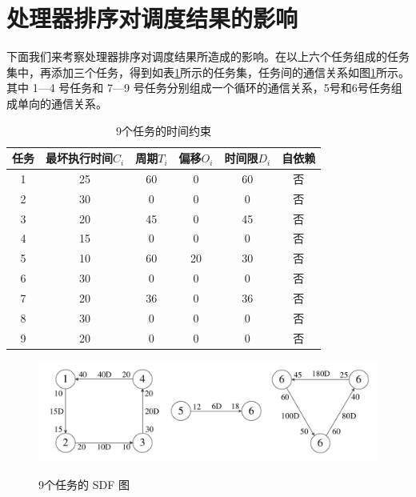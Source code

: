 \section{处理器排序对调度结果的影响}
下面我们来考察处理器排序对调度结果所造成的影响。在以上六个任务组成的任务集中，再添加三个任务，得到如表\ref{EXP-table-9task-time}所示的任务集，任务间的通信关系如图\ref{EXP-fig-9task-SDF}所示。其中 1---4 号任务和 7---9 号任务分别组成一个循环的通信关系，5号和6号任务组成单向的通信关系。
{\renewcommand{\arraystretch}{1.5}
\begin{table}
  \centering
  \caption{9个任务的时间约束}
  \label{EXP-table-9task-time}
  \begin{tabular}{|c|c|c|c|c|c|}
    \hline
    任务 & 最坏执行时间$C_i$ & 周期$T_i$ & 偏移$O_i$ & 时间限$D_i$ & 自依赖\\
    \hline
    1 & 25 & 60 & 0 & 60 & 否\\
    2 & 30 & 0 & 0 & 0 & 否\\
    3 & 20 & 45 & 0 & 45 & 否\\
    4 & 15 & 0 & 0 & 0 & 否\\
    5 & 10 & 60 & 20 & 30 & 否\\
    6 & 30 & 0 & 0 & 0 & 否\\
    7 & 20 & 36 & 0 & 36 & 否\\
    8 & 30 & 0 & 0 & 0 & 否\\
    9 & 20 & 0 & 0 & 0 & 否\\
    \hline
  \end{tabular}
\end{table}
}
\begin{figure}[!hbt]
  \centering
  \includegraphics[height=24ex]{figure/EXP-9task-SDF.pdf}\\
  \caption{9个任务的 SDF 图}\label{EXP-fig-9task-SDF}
\end{figure}

